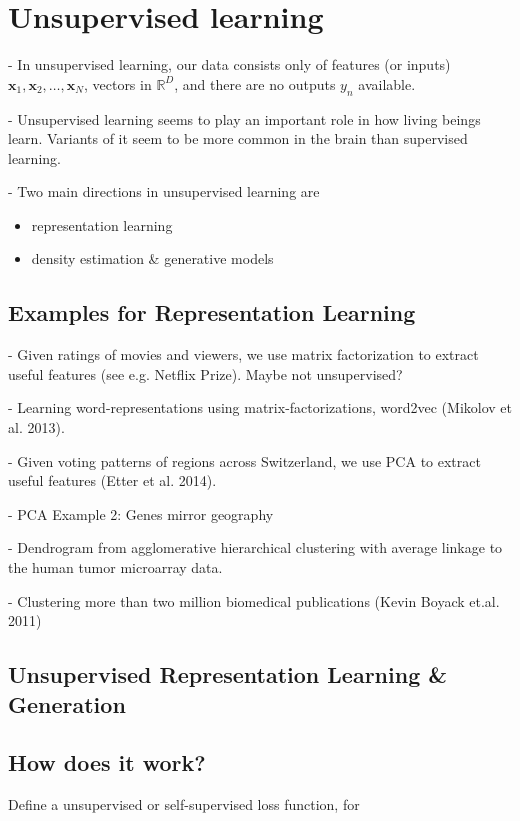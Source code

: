 \section*{Unsupervised learning}

- In unsupervised learning, our data consists only of features (or inputs) $\mathbf{x}_{1}, \mathbf{x}_{2}, \ldots, \mathbf{x}_{N}$, vectors in $\mathbb{R}^{D}$, and there are no outputs $y_{n}$ available.

- Unsupervised learning seems to play an important role in how living beings learn. Variants of it seem to be more common in the brain than supervised learning.

- Two main directions in unsupervised learning are

\begin{itemize}
  \item representation learning
  \item density estimation \& generative models
\end{itemize}

\subsection*{Examples for Representation Learning}
- Given ratings of movies and viewers, we use matrix factorization to extract useful features (see e.g. Netflix Prize). Maybe not unsupervised?

- Learning word-representations using matrix-factorizations, word2vec (Mikolov et al. 2013).

- Given voting patterns of regions across Switzerland, we use PCA to extract useful features (Etter et al. 2014).

- PCA Example 2: Genes mirror geography

- Dendrogram from agglomerative hierarchical clustering with average linkage to the human tumor microarray data.

- Clustering more than two million biomedical publications (Kevin Boyack et.al. 2011)

\subsection*{Unsupervised Representation Learning \& Generation}
\subsection*{How does it work?}
Define a unsupervised or self-supervised loss function, for

